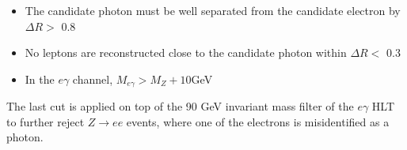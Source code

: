 \documentclass[thesis.tex]{subfiles}
\renewcommand\_{\textunderscore\allowbreak}
\begin{document}
\begin{itemize}
\item The candidate photon must be well separated from the candidate electron by $\Delta R >$ 0.8
\item No leptons are reconstructed close to the candidate photon within $\Delta R <$ 0.3
\item In the $e\gamma$ channel, $M_{e\gamma} > M_Z + 10 $GeV 
\end{itemize}

The last cut is applied on top of the 90 GeV invariant mass filter of the $e\gamma$ HLT to further reject $Z\rightarrow ee$ events, where one of the electrons is misidentified as a photon.
\end{document}
